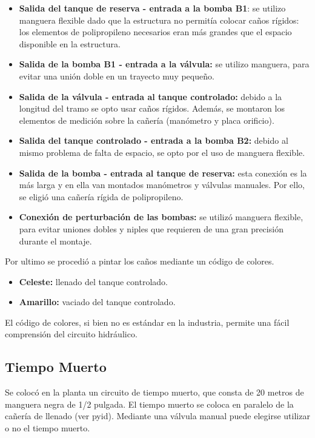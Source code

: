 \begin{itemize}
  \item \textbf{Salida del tanque de reserva - entrada a la bomba B1}:
  se utilizo manguera flexible dado que la estructura no permitía colocar caños
  rígidos: los elementos de polipropileno necesarios eran más grandes que el
  espacio disponible en la estructura.

  \item \textbf{Salida de la bomba B1 - entrada a la válvula:}
  se utilizo manguera, para evitar una unión doble en un trayecto muy pequeño.
  
  \item \textbf{Salida de la válvula - entrada al tanque controlado:}
  debido a la longitud del tramo se opto usar caños rígidos.
  Además, se montaron los elementos de medición sobre la cañería (manómetro y
  placa orificio).
  
  \item \textbf{Salida del tanque controlado - entrada a la bomba B2:}
  debido al mismo problema de falta de espacio, se opto por el uso de manguera
  flexible.
  
  \item \textbf{Salida de la bomba - entrada al tanque de reserva:}
  esta conexión es la más larga y en ella van montados manómetros y
  válvulas manuales. Por ello, se eligió una cañería rígida de polipropileno.

  \item \textbf{Conexión de perturbación de las bombas:}
  se utilizó manguera flexible, para evitar uniones dobles y
  niples que requieren de una gran precisión durante el montaje.
 \end{itemize}

Por ultimo se procedió a pintar los caños mediante un código de colores.
 \begin{itemize}
  \item {\color{Cerulean} \textbf{Celeste:}} llenado del tanque controlado.
  \item {\color{YellowOrange} \textbf{Amarillo:}} vaciado del tanque controlado.
 \end{itemize}
El código de colores, si bien no es estándar en la industria, permite una fácil
comprensión del circuito hidráulico.

\subsection{Tiempo Muerto}
\label{subsec:tiempoMuerto}
Se colocó en la planta un circuito de tiempo muerto, que consta de 20 metros de
manguera negra de 1/2 pulgada.
El tiempo muerto se coloca en paralelo de la cañería de llenado (ver
\gls{pyid}).
Mediante una válvula manual puede elegirse utilizar o no el tiempo muerto.

